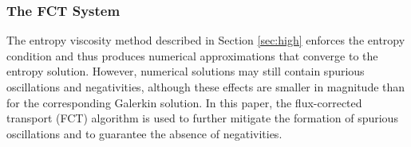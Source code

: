 
\subsubsection{The FCT System}

The entropy viscosity method described in Section \ref{sec:high} enforces
the entropy condition and thus produces numerical approximations that
converge to the entropy solution. However, numerical solutions may still
contain spurious oscillations and negativities, although these effects are
smaller in magnitude than for the corresponding Galerkin solution.
In this paper, the flux-corrected transport (FCT) algorithm
is used to further mitigate the formation of spurious oscillations and
to guarantee the absence of negativities.

